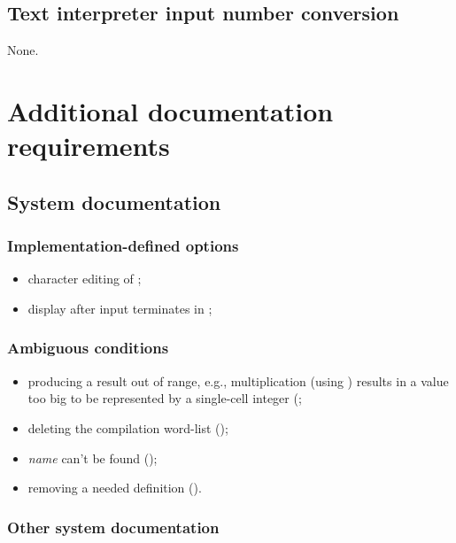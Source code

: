 \subsection{Text interpreter input number conversion} %

None.

\section{Additional documentation requirements} %

\subsection{System documentation} %

\subsubsection{Implementation-defined options} %

\begin{itemize}
\item character editing of ;
\item display after input terminates in ;
\end{itemize}

\subsubsection{Ambiguous conditions} %

\begin{itemize}
\item producing a result out of range, e.g., multiplication
	(using \word{*}) results in a value too big to be represented by
	a single-cell integer
	(;
\item deleting the compilation word-list ();
\item \emph{name} can't be found ();
\item removing a needed definition ().
\end{itemize}

\subsubsection{Other system documentation} %

